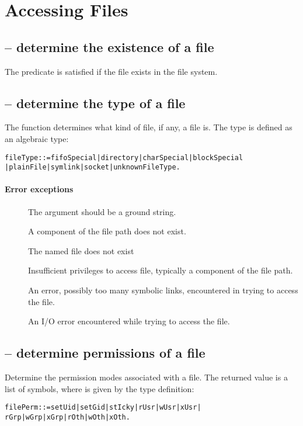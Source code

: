 \section{Accessing Files}
\label{io:file-access}

\subsection{ -- determine the existence of a file}
\label{io:ffile}
The  predicate is satisfied if the file exists in the file system.


\subsection{ -- determine the type of a file}
\label{io:ftype}
The  function determines what kind of file, if any, a file is. The  type is defined as an algebraic type:
\begin{alltt}
  fileType ::= fifoSpecial | directory | charSpecial | blockSpecial 
  | plainFile | symlink | socket | unknownFileType.
\end{alltt}

\paragraph{Error exceptions}
\begin{description}
\item[]
The argument should be a ground string.
\item[]
A component of the file path does not exist.
\item[]
The named file does not exist
\item[]
Insufficient privileges to access file, typically a component of the file path.
\item[]
An error, possibly too many symbolic links, encountered in trying to access the file.
\item[]
An I/O error encountered while trying to access the file.
\end{description}


\subsection{ -- determine permissions of a file}
\label{io:fmodes}
Determine the permission modes associated with a file. The returned value is a list of  symbols, where  is given by the type definition:
\begin{alltt}
  filePerm ::= setUid | setGid | stIcky | rUsr | wUsr | xUsr |
  rGrp | wGrp | xGrp | rOth | wOth | xOth.
\end{alltt}

